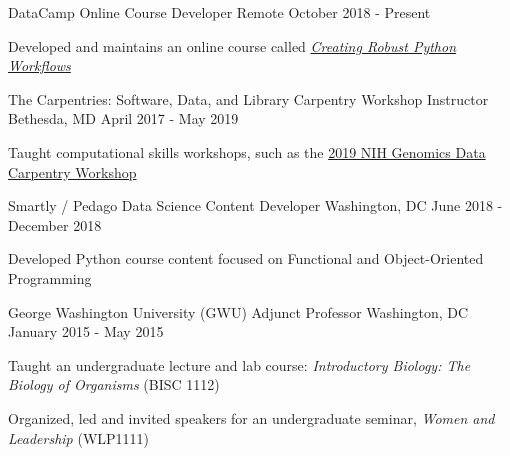 \begin{cventries}
  \cventry
    {DataCamp} %
    {Online Course Developer} %
    {Remote} %
    {October 2018 - Present} %
    {
      \begin{cvitems} %
        \item Developed and maintains an online course called \href{https://www.datacamp.com/courses/creating-robust-python-workflows}{\textit{\textcolor{awesome-skyblue}{Creating Robust Python Workflows}}}
      \end{cvitems}
    }

  \cventry
    {The Carpentries: Software, Data, and Library Carpentry} %
    {Workshop Instructor} %
    {Bethesda, MD} %
    {April 2017 - May 2019} %
    {
      \begin{cvitems} %
        \item {Taught computational skills workshops, such as the \href{https://davemcg.github.io/2019-05-01-NIH-Library-Data-Carpentry-Genomics/}{\textcolor{awesome-skyblue}{2019 NIH Genomics Data Carpentry Workshop}}}
      \end{cvitems}
    }
    
  \cventry
    {Smartly / Pedago} %
    {Data Science Content Developer} %
    {Washington, DC} %
    {June 2018 - December 2018} %
    {
      \begin{cvitems} %
        \item Developed Python course content focused on Functional and Object-Oriented Programming
      \end{cvitems}
    }

  \cventry
    {George Washington University (GWU)} %
    {Adjunct Professor} %
    {Washington, DC} %
    {January 2015 - May 2015} %
    {
      \begin{cvitems} %
        \item {Taught an undergraduate lecture and lab course: \textit{Introductory Biology: The Biology of Organisms} (BISC 1112)}
        \item {Organized, led and invited speakers for an undergraduate seminar, \textit{Women and Leadership} (WLP1111)}
      \end{cvitems}
    }

\end{cventries}
